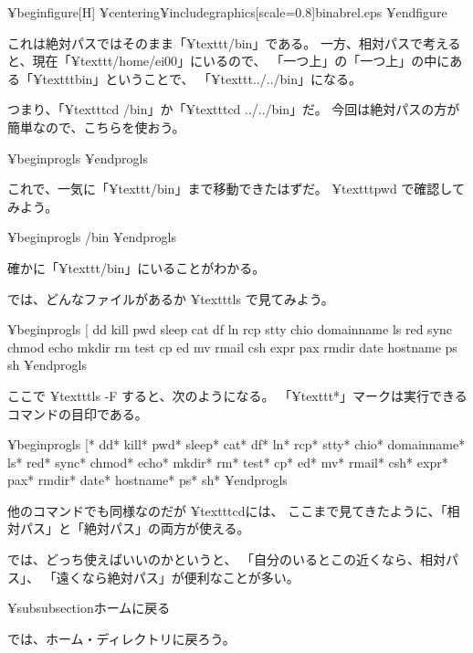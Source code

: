 {¥begin{figure}[H]
¥centering{¥includegraphics[scale=0.8]{binabrel.eps}}
¥end{figure}

これは絶対パスではそのまま「¥texttt{/bin}」である。
一方、相対パスで考えると、現在「¥texttt{/home/ei00}」にいるので、
「一つ上」の「一つ上」の中にある「¥texttt{bin}」ということで、
「¥texttt{../../bin}」になる。

つまり、「¥texttt{cd /bin}」か「¥texttt{cd ../../bin}」だ。
今回は絶対パスの方が簡単なので、こちらを使おう。

¥begin{progls}
%
¥end{progls}

これで、一気に「¥texttt{/bin}」まで移動できたはずだ。
 ¥texttt{pwd} で確認してみよう。

¥begin{progls}
/bin
%
¥end{progls}

確かに「¥texttt{/bin}」にいることがわかる。

では、どんなファイルがあるか ¥texttt{ls} で見てみよう。

¥begin{progls}
[               dd              kill            pwd             sleep
cat             df              ln              rcp             stty
chio            domainname      ls              red             sync
chmod           echo            mkdir           rm              test
cp              ed              mv              rmail
csh             expr            pax             rmdir
date            hostname        ps              sh
%
¥end{progls}

ここで ¥texttt{ls -F} すると、次のようになる。
「¥texttt{*}」マークは実行できるコマンドの目印である。

¥begin{progls}
[*              dd*             kill*           pwd*            sleep*
cat*            df*             ln*             rcp*            stty*
chio*           domainname*     ls*             red*            sync*
chmod*          echo*           mkdir*          rm*             test*
cp*             ed*             mv*             rmail*
csh*            expr*           pax*            rmdir*
date*           hostname*       ps*             sh*
%
¥end{progls}

他のコマンドでも同様なのだが ¥texttt{cd}には、
ここまで見てきたように、「相対パス」と「絶対パス」の両方が使える。

では、どっち使えばいいのかというと、
「自分のいるとこの近くなら、相対パス」、
「遠くなら絶対パス」が便利なことが多い。

¥subsubsection{ホームに戻る}

では、ホーム・ディレクトリに戻ろう。

}
